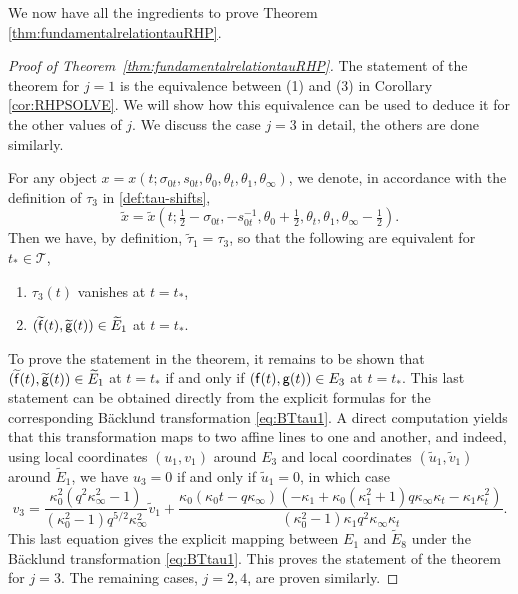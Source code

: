 \documentclass[a4paper,reqno,11pt]{amsart}
\numberwithin{equation}{section}
\numberwithin{figure}{section}
\theoremstyle{plain}
\theoremstyle{remark}
\numberwithin{rhp}{section}
\begin{document}
We now have all the ingredients to prove Theorem \ref{thm:fundamentalrelationtauRHP}.



\begin{proof}[Proof of Theorem~\ref{thm:fundamentalrelationtauRHP}] The statement of the theorem for $j=1$ is the equivalence between (1) and (3) in Corollary \ref{cor:RHPSOLVE}. We will show how this equivalence can be used to deduce it for the other values of $j$. We discuss the case $j=3$ in detail, the others are done similarly.

For any object $x=x(t;\sigma_{0t},s_{0t},\theta_0,\theta_t,\theta_1,\theta_\infty)$, we denote, in accordance with the definition of $\tau_3$ in \eqref{def:tau-shifts},
\begin{equation*}
    \widetilde{x}=\widetilde{x}(t; \tfrac{1}{2}-\sigma_{0t}, -s_{0t}^{-1}, \theta_0+\tfrac{1}{2}, \theta_t, \theta_{1}, \theta_{\infty}-\tfrac{1}{2}).
\end{equation*}
Then we have, by definition, $\widetilde{\tau}_1=\tau_3$, so that the following are equivalent for $t_*\in \mathcal{T}$,
\begin{enumerate}
    \item $\tau_3(t)$ vanishes at $t=t_*$,
    \item $(\widetilde{ {\sf f}}(t),\widetilde{ {\sf g}}(t))\in\widetilde{E}_1$ at $t=t_*$.
\end{enumerate}
To prove the statement in the theorem, it remains to be shown that $(\widetilde{ {\sf f}}(t),\widetilde{ {\sf g}}(t))\in\widetilde{E}_1$ at $t=t_*$ if and only if $( {\sf f}(t), {\sf g}(t))\in E_3$ at $t=t_*$. This last statement can be obtained directly from the explicit formulas for the corresponding B\"acklund transformation \eqref{eq:BTtau1}. A direct computation yields that this transformation maps to two affine lines to one and another, and indeed,
using local coordinates $(u_1,v_1)$ around $E_3$ and local coordinates $(\widetilde{u}_1,\widetilde{v}_1)$ around $\widetilde{E}_1$, we have $u_3=0$ if and only if $\widetilde{u}_1=0$, in which case
\begin{equation*}
    v_3=\frac{\kappa _0^2 \left(q^2 \kappa _{\infty }^2-1\right)}{\left(\kappa _0^2-1\right) q^{5/2} \kappa _{\infty }^2}\widetilde{v}_1+\frac{\kappa _0 \left(\kappa _0 t-q \kappa _{\infty }\right) \left(-\kappa _1+\kappa _0 \left(\kappa _1^2+1\right) q \kappa _{\infty } \kappa _t-\kappa _1 \kappa _t^2\right)}{\left(\kappa _0^2-1\right) \kappa _1 q^2 \kappa _{\infty } \kappa _t}.
\end{equation*}
This last equation gives the explicit mapping between $E_1$ and $\widetilde{E}_8$ under the B\"acklund transformation \eqref{eq:BTtau1}. This proves the statement of the theorem for $j=3$. The remaining cases, $j=2,4$, are proven similarly.
\end{proof}
\end{document}
